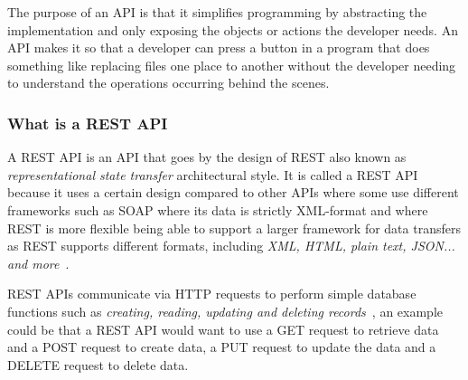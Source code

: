 The purpose of an API is that it simplifies programming by abstracting the implementation and only exposing the objects
or actions the developer needs.
An API makes it so that a developer can press a button in a program that does something like replacing files one place
to another without the developer needing to understand the operations occurring behind the scenes.

\subsubsection{What is a REST API}\label{subsubsec:what-is-a-rest-api}

A REST API is an API that goes by the design of REST also known as \textit{representational state transfer}
architectural style.
It is called a REST API because it uses a certain design compared to other APIs where some use different frameworks
such as SOAP where its data is strictly XML-format and where REST is more flexible being able to support a larger
framework for data transfers as REST supports different formats, including \textit{XML, HTML, plain text, JSON... and
more}~\cite{IBMrestapi}.

REST APIs communicate via HTTP requests to perform simple database functions such as \textit{creating, reading,
    updating and deleting records}~\cite{IBMrestapi}, an example could be that a REST API would want to use a GET
request to retrieve data and a POST request to create data, a PUT request to update the data and a DELETE request to
delete data.

